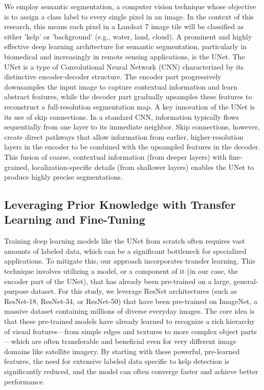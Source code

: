 \documentclass{article}
\begin{document}
We employ semantic segmentation, a computer vision technique whose objective is to assign a class label to every single pixel in an image. In the context of this research, this means each pixel in a Landsat 7 image tile will be classified as either 'kelp' or 'background' (e.g., water, land, cloud). A prominent and highly effective deep learning architecture for semantic segmentation, particularly in biomedical and increasingly in remote sensing applications, is the UNet. The UNet is a type of Convolutional Neural Network (CNN) characterized by its distinctive encoder-decoder structure. The encoder part progressively downsamples the input image to capture contextual information and learn abstract features, while the decoder part gradually upsamples these features to reconstruct a full-resolution segmentation map. A key innovation of the UNet is its use of skip connections. In a standard CNN, information typically flows sequentially from one layer to its immediate neighbor. Skip connections, however, create direct pathways that allow information from earlier, higher-resolution layers in the encoder to be combined with the upsampled features in the decoder. This fusion of coarse, contextual information (from deeper layers) with fine-grained, localization-specific details (from shallower layers) enables the UNet to produce highly precise segmentations.

\subsection{Leveraging Prior Knowledge with Transfer Learning and Fine-Tuning} 

Training deep learning models like the UNet from scratch often requires vast amounts of labeled data, which can be a significant bottleneck for specialized applications. To mitigate this, our approach incorporates transfer learning. This technique involves utilizing a model, or a component of it (in our case, the encoder part of the UNet), that has already been pre-trained on a large, general-purpose dataset. For this study, we leverage ResNet architectures (such as ResNet-18, ResNet-34, or ResNet-50) that have been pre-trained on ImageNet, a massive dataset containing millions of diverse everyday images. The core idea is that these pre-trained models have already learned to recognize a rich hierarchy of visual features—from simple edges and textures to more complex object parts—which are often transferable and beneficial even for very different image domains like satellite imagery. By starting with these powerful, pre-learned features, the need for extensive labeled data specific to kelp detection is significantly reduced, and the model can often converge faster and achieve better performance.
\end{document}
